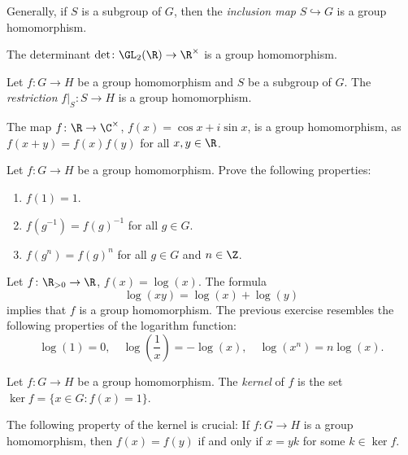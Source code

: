 Generally, if $S$ is a subgroup of $G$, 
then the \emph{inclusion map}  $S\hookrightarrow G$ is a group
homomorphism. 

\begin{example}
The determinant $\det\colon\GL_2(\R)\to\R^\times$ is a group homomorphism. 
\end{example}

\begin{example}
    Let $f\colon G\to H$ be a group homomorphism and
    $S$ be a subgroup of $G$.
    The \emph{restriction} $f|_S\colon S\to H$ is a group homomorphism. 
\end{example}

\begin{example}
The map $f\colon\R\to\C^\times$, $f(x)=\cos x+i\sin x$, is a group
homomorphism, as 
$f(x+y)=f(x)f(y)$ for all $x,y\in\R$.
\end{example}

\begin{exercise}
Let $f\colon G\to H$ be a group homomorphism. Prove the following properties: 
\begin{enumerate}
    \item $f(1)=1$.
    \item $f(g^{-1})=f(g)^{-1}$ for all $g\in G$.
    \item $f(g^n)=f(g)^n$ for all $g\in G$ and $n\in\Z$.
\end{enumerate}
\end{exercise}

\begin{example}
Let $f\colon\R_{>0}\to\R$, $f(x)=\log(x)$. The formula 
\[\log(xy)=\log(x)+
\log(y)
\]
implies that $f$ is a group homomorphism. 
The previous exercise resembles 
the following properties of the logarithm function: 
\[
\log(1)=0,
\quad
\log\left(\frac{1}{x}\right)=-\log(x),
\quad
\log(x^n)=n\log(x).
\]
\end{example}

\begin{definition}
        Let $f\colon G\to H$ be a group homomorphism. The \emph{kernel} of $f$
        is the set 
        $\ker f=\{x\in G:f(x)=1\}$.
\end{definition}

The following property of the kernel is crucial: If $f\colon G\to H$
is a group homomorphism, then 
$f(x)=f(y)$ if and only if $x=yk$ for some $k\in\ker f$.


